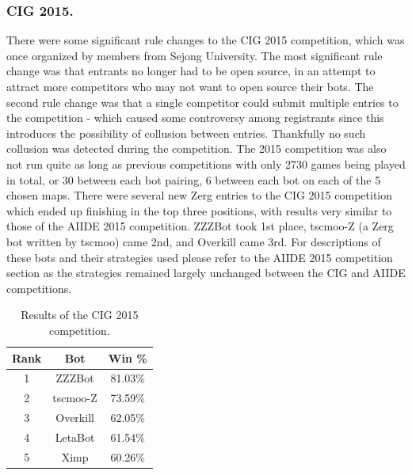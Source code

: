 \documentclass{llncs}
\begin{document}
\subsubsection*{CIG 2015.}
There were some significant rule changes to the CIG 2015 competition, which was once organized by members from Sejong University. The most significant rule change was that entrants no longer had to be open source, in an attempt to attract more competitors who may not want to open source their bots. The second rule change was that a single competitor could submit multiple entries to the competition - which caused some controversy among registrants since this introduces the possibility of collusion between entries. Thankfully no such collusion was detected during the competition. The 2015 competition was also not run quite as long as previous competitions with only 2730 games being played in total, or 30 between each bot pairing, 6 between each bot on each of the 5 chosen maps. There were several new Zerg entries to the CIG 2015 competition which ended up finishing in the top three positions, with results very similar to those of the AIIDE 2015 competition. ZZZBot took 1st place, tscmoo-Z (a Zerg bot written by tscmoo) came 2nd, and Overkill came 3rd. For descriptions of these bots and their strategies used please refer to the AIIDE 2015 competition section as the strategies remained largely unchanged between the CIG and AIIDE competitions. 

\begin{table}[t]
\caption{Results of the CIG 2015 competition.}
\label{tab:cig2015}
\centering
\begin{tabular}{|c|c|c|}
\hline
{\bfseries Rank} & {\bfseries Bot} & {\bfseries Win \%} \\
\hline
1 & ZZZBot & 81.03\% \\
2 & tscmoo-Z & 73.59\% \\
3 & Overkill & 62.05\% \\
4 & LetaBot & 61.54\% \\
5 & Ximp & 60.26\% \\ 
\hline
\end{tabular}
\end{table}
\end{document}
